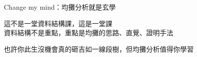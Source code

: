 \begin{frame}{\ebtitle}
    Change my mind：均攤分析就是玄學
\end{frame}

\begin{frame}{}
    這不是一堂資料結構課，這是一堂課 \\
    資料結構不是重點，重點是均攤的思路、直覺、證明手法

    也許你此生沒機會真的砸吉如一線段樹，但均攤分析值得你學習
\end{frame}
